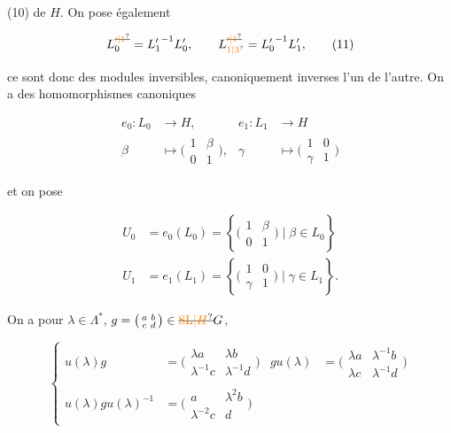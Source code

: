
(10) de $H$. On pose également

\[
L_0^{\deleted{\unsure{\prime|1}}}={L'_1}^{-1}L'_0,\qquad
L_{\unsure{1|3}}^{\deleted{\unsure{\prime|1}}}={L'_0}^{-1}L'_1,\tag*{(11)}
\]

ce sont donc des modules inversibles, canoniquement inverses l'un de l'autre. On a des homomorphismes canoniques

\[
\begin{aligned}
 e_0:L_0&\longrightarrow H,&e_1:L_1&\longrightarrow H\\
 \beta&\longmapsto \bigl(\begin{smallmatrix}1&\beta\\0&1\end{smallmatrix}\bigr),& \gamma&\longmapsto \bigl(\begin{smallmatrix}1&0\\\gamma&1\end{smallmatrix}\bigr)
\end{aligned}\tag*{(12)}
\]

et on pose

\[
\begin{aligned}
 U_0&=e_0(L_0)=\left\{\bigl(\begin{smallmatrix}1&\beta\\0&1\end{smallmatrix}\bigr)\mid\beta\in L_0\right\}\\
 U_1&=e_1(L_1)=\left\{\bigl(\begin{smallmatrix}1&0\\\gamma&1\end{smallmatrix}\bigr)\mid\gamma\in L_1\right\}.
\end{aligned}\tag*{(13)}
\]

On a pour $\lambda\in\Lambda^*$, $g=\bigl(\begin{smallmatrix}a&b\\c&d\end{smallmatrix}\bigr)\in\deleted{\unsure{\mathrm{SL}|H}}G$,

\[
\left\{\begin{aligned}
 u(\lambda)g&=\bigl(\begin{smallmatrix}\lambda a&\lambda b\\\lambda^{-1}c&\lambda^{-1}d\end{smallmatrix}\bigr)&
 gu(\lambda)&=\bigl(\begin{smallmatrix}\lambda a&\lambda^{-1}b\\\lambda c&\lambda^{-1}d\end{smallmatrix}\bigr)\\
 u(\lambda)gu(\lambda)^{-1}&=\bigl(\begin{smallmatrix}a&\lambda^2b\\\lambda^{-2}c&d\end{smallmatrix}\bigr)
\end{aligned}\right.\tag*{(14)}
\]

